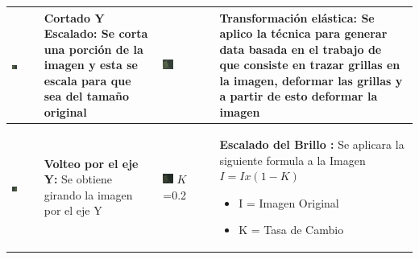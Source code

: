 \begin{table}[H]
\begin{tabular}{|M{0.225\textwidth}|M{0.225\textwidth}|M{0.225\textwidth}|M{0.225\textwidth}|}
\includegraphics[width=0.225\textwidth]{06changedetection/tranformaciones/rescale.png}             &\scriptsize{\textbf{Cortado Y Escalado:} Se corta una porción de la imagen y esta se escala para que sea del tamaño original  }    &\includegraphics[width=0.225\textwidth]{06changedetection/tranformaciones/elsatica.png}              & \scriptsize{\textbf{Transformación elástica:} Se aplico la técnica para generar data basada en el trabajo de~\cite{simard2003best} que consiste en trazar grillas en la imagen, deformar las grillas y a partir de esto deformar la imagen  }           \\ \hline





\includegraphics[width=0.225\textwidth]{06changedetection/tranformaciones/izquierdaDerecha.png}              & \scriptsize{\textbf{Volteo por el eje Y:} Se obtiene girando la imagen por el eje Y} &\includegraphics[width=0.225\textwidth]{06changedetection/tranformaciones/escaladoBrillo.png}         $K$=0.2        & \scriptsize{\textbf{Escalado del Brillo :} Se aplicara la siguiente formula a la Imagen \newline$ I =Ix(1-K) $  \smallskip \begin{itemize}
\itemsep0em 
 \item I = Imagen Original
 \item K = Tasa de Cambio
\end{itemize}  }          \\ \hline





\end{tabular}
\end{table}
